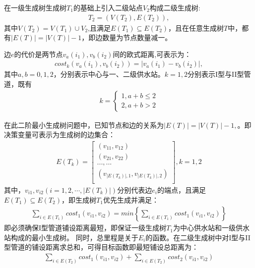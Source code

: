 \documentclass{whutmod}
\begin{document}
		在一级生成树生成树$T_1$的基础上引入二级站点$V_2$构成二级生成树:
		\begin{gather*}	
		T_{2}=(V(T_{2}),E(T_{2})),
		\end{gather*}
		其中$V(T_{2})=V(T_{1})\cup V_2$,且满足$E(T_{1})\subseteq  E(T_{2})$，且在任意生成树$T$中，都有$|E(T)|=|V(T)|-1$，即边数量为节点数量减一。
		
		边$e$的代价是两节点$v_a(i_1), v_b(i_2)$间的欧式距离,可表示为：
		\begin{gather}
		cost_{k}(v_a(i_1),v_b(i_2))=\left | v_a(i_1)-v_b(i_2) \right |,
		\end{gather}
		其中$a,b=0,1,2$，分别表示中心与一、二级供水站。$k=1,2$分别表示I型与II型管道，既有
			\begin{gather}
			k=\left\{\begin{matrix}1,a+b\leqslant 2
			\\ 2,a+b>2
			\end{matrix}\right.
			\end{gather}
		
		
		
		
			在此二阶最小生成树问题中，已知节点和边的关系为$|E(T)|=|V(T)|-1, $。即决策变量可表示为生成树的边集合：
			\begin{gather}
			E(T_k)=
			\begin{bmatrix}
			(v_{11} ,v_{12}) \\ 
			(v_{21} ,v_{22} )\\ 
			...,...\\
			(v_{|E(T_k)|,1},v_{|E(T_k)|,2})\\
			\end{bmatrix},k=1,2
			\end{gather}
			其中，$v_{i1}, v_{i2}(i =1,2,\cdots,|E(T_k)|)$分别代表边$e_i$的端点，且满足$E(T_1)\subseteq E(T_2)$，即生成树$T_1$优先生成并满足：
			\begin{gather}
			\sum_{i\in E(T_1) }cost_1(v_{i1},v_{i2})=min\left \{ 	\sum_{i\in E(T_1) }cost_1(v_{i1},v_{i2}) \right \}
			\end{gather}
			即必须确保I型管道铺设距离最短，即保证一级生成树$T_1$为中心供水站和一级供水站构成的最小生成树。
			 同时，总里程是关于$E_{i}$的函数。在二级生成树中对I型与II型管道的铺设距离求总和，可得目标函数即最短铺设总距离为：
			\begin{gather}
	         	\sum_{i\in E(T_2) }cost_1(v_{i1},v_{i2})+\sum_{i\in E(T_2) }cost_2(v_{i1},v_{i2})
			\end{gather}
			
\end{document}
